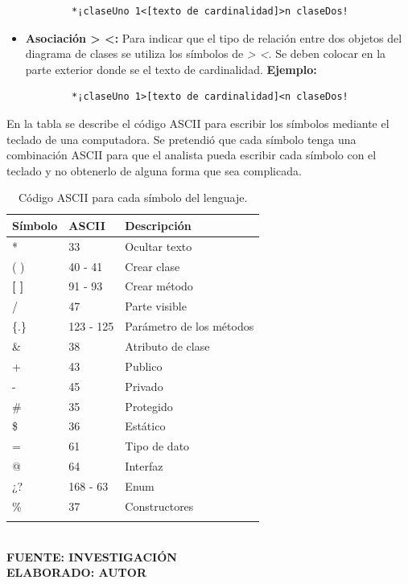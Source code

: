 \begin{itemize}
	\begin{verbatim}
		*¡claseUno 1<[texto de cardinalidad]>n claseDos!
	\end{verbatim}

	\item \textbf{Asociación > <:} Para indicar que el tipo de relación entre dos objetos del diagrama de clases se utiliza los símbolos de \textit{> <}. Se deben colocar en la parte exterior donde se el texto de cardinalidad. \textbf{Ejemplo:}
	
	\begin{verbatim}
		*¡claseUno 1>[texto de cardinalidad]<n claseDos!
	\end{verbatim}
	
\end{itemize}

En la tabla se describe el código ASCII para escribir los símbolos mediante el teclado de una computadora. Se pretendió que cada símbolo tenga una combinación ASCII para que el analista pueda escribir cada símbolo con el teclado y no obtenerlo de alguna forma que sea complicada.

\begin{table}[h!]
	\centering
	\caption{Código ASCII para cada símbolo del lenguaje.}
	\begin{tabular}{p{2cm}p{4cm}p{5cm}}
		\toprule
		\textbf{Símbolo} & \textbf{ASCII} & \textbf{Descripción} \\
		\midrule
		* & 33 & Ocultar texto \\
		\addlinespace
		( ) & 40 - 41 & Crear clase \\
		\addlinespace
		\textbf{[ ]} & 91 - 93 & Crear método \\
		\addlinespace
		/ & 47 & Parte visible \\
		\addlinespace
		\{.\} & 123 - 125	 & Parámetro de los métodos \\
		\addlinespace 	
		\& & 38 & Atributo de clase \\
		\addlinespace
		+ & 43 & Publico \\
		\addlinespace
		- & 45 & Privado \\
		\addlinespace
		\# & 35 & Protegido \\
		\addlinespace
		\$ & 36 & Estático \\
		\addlinespace
		= & 61 & Tipo de dato \\
		\addlinespace
		@ & 64 & Interfaz \\
		\addlinespace
		¿? & 168 - 63 & Enum \\
		\addlinespace
		\% & 37 & Constructores \\
		\addlinespace
		\bottomrule
	\end{tabular}
	\vspace{4mm}
	{\footnotesize \textbf{\\ FUENTE: INVESTIGACIÓN} \textbf{\\ ELABORADO: AUTOR}}
\end{table}

